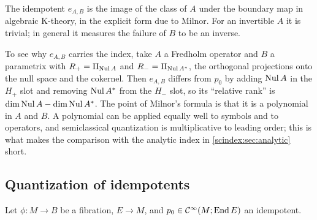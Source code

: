 The idempotent $e_{A,B}$ is the image of the class of $A$ under the boundary map
in algebraic K-theory, in the explicit form due to Milnor. For an invertible
$A$ it is trivial; in general it measures the failure of $B$ to be an inverse.

\begin{discussion}
  To see why $e_{A,B}$ carries the index, take $A$ a Fredholm operator and $B$ a
  parametrix with $R_+=\Pi_{\operatorname{Nul} A}$ and $R_-=\Pi_{\operatorname{Nul} A^*}$, the orthogonal
  projections onto the null space and the cokernel. Then $e_{A,B}$ differs from
  $p_0$ by adding $\operatorname{Nul} A$ in the $H_+$ slot and removing $\operatorname{Nul} A^*$ from the
  $H_-$ slot, so its ``relative rank'' is $\dim\operatorname{Nul} A-\dim\operatorname{Nul} A^*$. The point of
  Milnor's formula is that it is a polynomial in $A$ and $B$. A polynomial can be
  applied equally well to symbols and to operators, and semiclassical quantization
  is multiplicative to leading order; this is what makes the comparison with the
  analytic index in \cref{scindex:sec:analytic} short.
\end{discussion}

\subsection{Quantization of idempotents}
Let $\phi:M\to B$ be a fibration, $E\to M$, and $p_0\in\mathcal{C}^\infty(M;\operatorname{End} E)$ an
idempotent.

